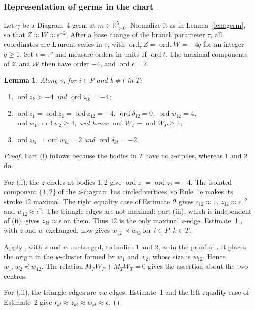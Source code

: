 \documentclass[11pt]{amsart}
\newenvironment{romanlist}{\begin{enumerate}\renewcommand{\labelenumi}{(\roman{enumi})}%
  \renewcommand{\theenumi}{\roman{enumi}}}{\end{enumerate}}
\newtheorem{lemma}[theorem]{Lemma}
\theoremstyle{definition}
\theoremstyle{remark}
\newcommand{\Rp}{\mathbb{R}_{>0}}
\newcommand{\ord}{\operatorname{ord}}
\begin{document}
\subsubsection{Representation of germs in the chart}\label{d4-cover}
{Let $\gamma$ be a Diagram~4 germ at $m\in\Rp^5$.
Normalize it as in Lemma~\ref{lem:germ}, so that $Z\approx W\approx\epsilon^{-2}$.
After a base change of the branch parameter $\tau$, all coordinates are Laurent series
in $\tau$, with $\ord_\tau Z=\ord_\tau W=-4q$ for an integer $q\ge1$.
Set $t=\tau^q$ and measure orders in units of $\ord t$.
The maximal components of $\mathcal Z$ and $\mathcal W$ then have order $-4$,
and $\ord\epsilon=2$.}

\begin{lemma}\label{lem:d4-val}
Along $\gamma$, for $i\in P$ and $k\ne l$ in $T$:
\begin{romanlist}
  \item $\ord z_k>-4$ and $\ord z_{ik}=-4$;
  \item $\ord z_1=\ord z_2=\ord z_{12}=-4$, $\ord\delta_{12}=0$, $\ord w_{12}=4$,
  $\ord w_1,\ord w_2\ge4$, and hence $\ord W_T=\ord W_P\ge4$;
  \item $\ord z_{kl}=\ord w_{kl}=2$ and $\ord\delta_{kl}=-2$.
\end{romanlist}
\end{lemma}

\begin{proof}
{Part (i) follows because the bodies in $T$ have no $z$-circles, whereas $1$ and $2$ do.

For (ii), the $z$-circles at bodies $1,2$ give $\ord z_1=\ord z_2=-4$.
The isolated component $\{1,2\}$ of the $z$-diagram has circled vertices, so Rule~1e
\cite[p.~546]{AK} makes its stroke $12$ maximal. The right equality case of Estimate~2
\cite[p.~548]{AK} gives $r_{12}\approx1$, $z_{12}\approx\epsilon^{-2}$ and
$w_{12}\approx\epsilon^2$. The triangle edges are not maximal: part (iii), which is independent
of (ii), gives $z_{kl}\approx\epsilon$ on them. Thus $12$ is the only maximal $z$-edge.
Estimate~1 \cite[p.~548]{AK}, with $z$ and $w$ exchanged, now gives $w_{12}\prec w_{ik}$
for $i\in P$, $k\in T$.

Apply \cite[Prop.~1, p.~559]{AK}, with $z$ and $w$ exchanged, to bodies $1$ and $2$,
as in the proof of \cite[Prop.~4, p.~564]{AK}. It places the origin in the $w$-cluster
formed by $w_1$ and $w_2$, whose size is $w_{12}$. Hence $w_1,w_2\preccurlyeq w_{12}$.
The relation $M_PW_P+M_TW_T=0$ gives the assertion about the two centres.

For (iii), the triangle edges are $zw$-edges. Estimate~1 and the left equality case
of Estimate~2 give $r_{kl}\approx z_{kl}\approx w_{kl}\approx\epsilon$.}
\end{proof}
\end{document}
